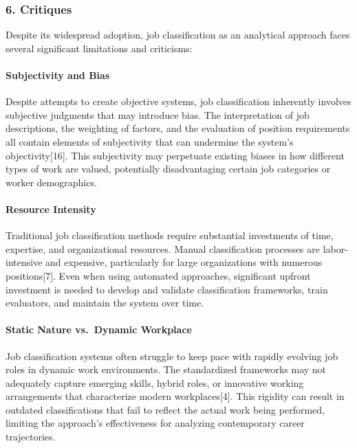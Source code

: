 \documentclass[./main.tex]{subfiles}
\begin{document}
\subsubsection{6. Critiques}\label{critiques}

Despite its widespread adoption, job classification as an analytical
approach faces several significant limitations and criticisms:

\paragraph{Subjectivity and Bias}\label{subjectivity-and-bias}

Despite attempts to create objective systems, job classification
inherently involves subjective judgments that may introduce bias. The
interpretation of job descriptions, the weighting of factors, and the
evaluation of position requirements all contain elements of subjectivity
that can undermine the system's objectivity{[}16{]}. This subjectivity
may perpetuate existing biases in how different types of work are
valued, potentially disadvantaging certain job categories or worker
demographics.

\paragraph{Resource Intensity}\label{resource-intensity}

Traditional job classification methods require substantial investments
of time, expertise, and organizational resources. Manual classification
processes are labor-intensive and expensive, particularly for large
organizations with numerous positions{[}7{]}. Even when using automated
approaches, significant upfront investment is needed to develop and
validate classification frameworks, train evaluators, and maintain the
system over time.

\paragraph{Static Nature vs.~Dynamic
Workplace}\label{static-nature-vs.-dynamic-workplace}

Job classification systems often struggle to keep pace with rapidly
evolving job roles in dynamic work environments. The standardized
frameworks may not adequately capture emerging skills, hybrid roles, or
innovative working arrangements that characterize modern
workplaces{[}4{]}. This rigidity can result in outdated classifications
that fail to reflect the actual work being performed, limiting the
approach's effectiveness for analyzing contemporary career trajectories.
\end{document}
